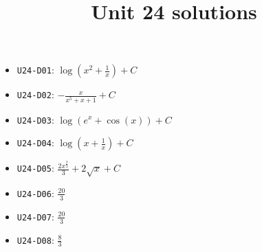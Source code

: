 \title{Unit 24 solutions}\maketitle\begin{itemize}
  \item \texttt{U24-D01}: $\log{\left(x^{2} + \frac{1}{x} \right)}+C$
  \item \texttt{U24-D02}: $- \frac{x}{x^{5} + x + 1}+C$
  \item \texttt{U24-D03}: $\log{\left(e^{x} + \cos{\left(x \right)} \right)}+C$
  \item \texttt{U24-D04}: $\log{\left(x + \frac{1}{x} \right)}+C$
  \item \texttt{U24-D05}: $\frac{2 x^{\frac{3}{2}}}{3} + 2 \sqrt{x}+C$
  \item \texttt{U24-D06}: $\frac{20}{3}$
  \item \texttt{U24-D07}: $\frac{20}{3}$
  \item \texttt{U24-D08}: $\frac{8}{3}$
\end{itemize}
